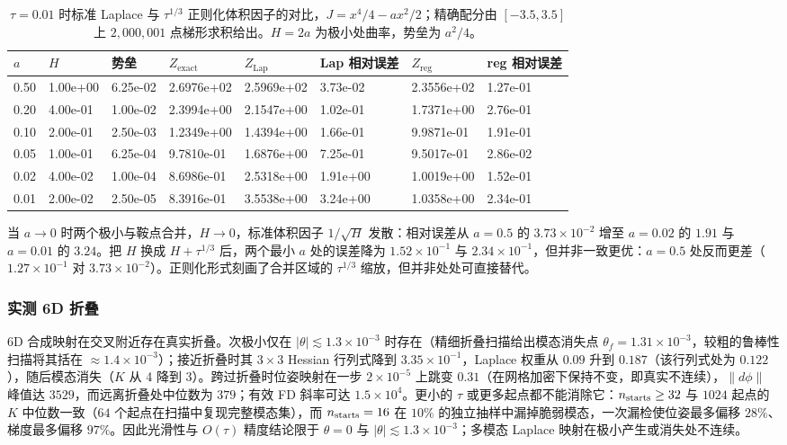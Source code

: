 \begin{table}[t]
\centering
\caption{$\tau=0.01$ 时标准 Laplace 与 $\tau^{1/3}$ 正则化体积因子的对比，$J=x^4/4-ax^2/2$；精确配分由 $[-3.5,3.5]$ 上 $2{,}000{,}001$ 点梯形求积给出。$H=2a$ 为极小处曲率，势垒为 $a^2/4$。}
\label{tab:fold}
\scriptsize
\setlength{\tabcolsep}{2.5pt}
\begin{tabular}{@{}l l l l l l l l@{}}
\toprule
$a$ & $H$ & 势垒 & $Z_{\mathrm{exact}}$ & $Z_{\mathrm{Lap}}$ & Lap 相对误差 & $Z_{\mathrm{reg}}$ & reg 相对误差\\
\midrule
0.50 & 1.00e+00 & 6.25e-02 & 2.6976e+02 & 2.5969e+02 & 3.73e-02 & 2.3556e+02 & 1.27e-01\\
0.20 & 4.00e-01 & 1.00e-02 & 2.3994e+00 & 2.1547e+00 & 1.02e-01 & 1.7371e+00 & 2.76e-01\\
0.10 & 2.00e-01 & 2.50e-03 & 1.2349e+00 & 1.4394e+00 & 1.66e-01 & 9.9871e-01 & 1.91e-01\\
0.05 & 1.00e-01 & 6.25e-04 & 9.7810e-01 & 1.6876e+00 & 7.25e-01 & 9.5017e-01 & 2.86e-02\\
0.02 & 4.00e-02 & 1.00e-04 & 8.6986e-01 & 2.5318e+00 & 1.91e+00 & 1.0019e+00 & 1.52e-01\\
0.01 & 2.00e-02 & 2.50e-05 & 8.3916e-01 & 3.5538e+00 & 3.24e+00 & 1.0358e+00 & 2.34e-01\\
\bottomrule
\end{tabular}
\end{table}

当 $a\to0$ 时两个极小与鞍点合并，$H\to0$，标准体积因子 $1/\sqrt{H}$ 发散：相对误差从 $a=0.5$ 的 $3.73\times10^{-2}$ 增至 $a=0.02$ 的 $1.91$ 与 $a=0.01$ 的 $3.24$。把 $H$ 换成 $H+\tau^{1/3}$ 后，两个最小 $a$ 处的误差降为 $1.52\times10^{-1}$ 与 $2.34\times10^{-1}$，但并非一致更优：$a=0.5$ 处反而更差（$1.27\times10^{-1}$ 对 $3.73\times10^{-2}$）。正则化形式刻画了合并区域的 $\tau^{1/3}$ 缩放，但并非处处可直接替代。

\subsubsection{实测 6D 折叠}\label{sec:fold6d}

6D 合成映射在交叉附近存在真实折叠。次极小仅在 $|\theta|\lesssim1.3\times10^{-3}$ 时存在（精细折叠扫描给出模态消失点 $\theta_f=1.31\times10^{-3}$，较粗的鲁棒性扫描将其括在 $\approx1.4\times10^{-3}$）；接近折叠时其 $3\times3$ Hessian 行列式降到 $3.35\times10^{-1}$，Laplace 权重从 $0.09$ 升到 $0.187$（该行列式处为 $0.122$），随后模态消失（$K$ 从 4 降到 3）。跨过折叠时位姿映射在一步 $2\times10^{-5}$ 上跳变 $0.31$（在网格加密下保持不变，即真实不连续），$\|d\phi\|$ 峰值达 $3529$，而远离折叠处中位数为 $379$；有效 FD 斜率可达 $1.5\times10^4$。更小的 $\tau$ 或更多起点都不能消除它：$n_{\rm starts}\ge32$ 与 $1024$ 起点的 $K$ 中位数一致（$64$ 个起点在扫描中复现完整模态集），而 $n_{\rm starts}=16$ 在 $10\%$ 的独立抽样中漏掉脆弱模态，一次漏检使位姿最多偏移 $28\%$、梯度最多偏移 $97\%$。因此光滑性与 $O(\tau)$ 精度结论限于 $\theta=0$ 与 $|\theta|\lesssim1.3\times10^{-3}$；多模态 Laplace 映射在极小产生或消失处不连续。

